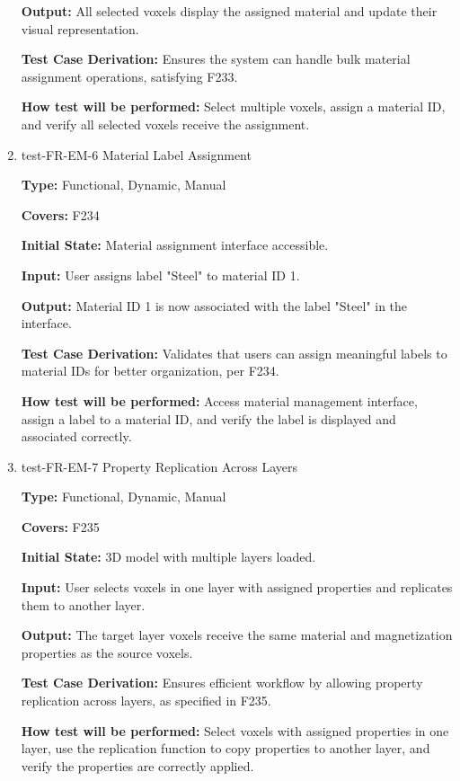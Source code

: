 \documentclass[12pt, titlepage]{article}
\begin{document}
\begin{enumerate}
\textbf{Output:} All selected voxels display the assigned material and update their visual representation.

\textbf{Test Case Derivation:} Ensures the system can handle bulk material assignment operations, satisfying F233.
					
\textbf{How test will be performed:} Select multiple voxels, assign a material ID, and verify all selected voxels receive the assignment.

\item{test-FR-EM-6 Material Label Assignment\\}

\textbf{Type:} Functional, Dynamic, Manual

\textbf{Covers:} F234
					
\textbf{Initial State:} Material assignment interface accessible.
					
\textbf{Input:} User assigns label "Steel" to material ID 1.
					
\textbf{Output:} Material ID 1 is now associated with the label "Steel" in the interface.

\textbf{Test Case Derivation:} Validates that users can assign meaningful labels to material IDs for better organization, per F234.
					
\textbf{How test will be performed:} Access material management interface, assign a label to a material ID, and verify the label is displayed and associated correctly.

\item{test-FR-EM-7 Property Replication Across Layers\\}

\textbf{Type:} Functional, Dynamic, Manual

\textbf{Covers:} F235
					
\textbf{Initial State:} 3D model with multiple layers loaded.
					
\textbf{Input:} User selects voxels in one layer with assigned properties and replicates them to another layer.
					
\textbf{Output:} The target layer voxels receive the same material and magnetization properties as the source voxels.

\textbf{Test Case Derivation:} Ensures efficient workflow by allowing property replication across layers, as specified in F235.
					
\textbf{How test will be performed:} Select voxels with assigned properties in one layer, use the replication function to copy properties to another layer, and verify the properties are correctly applied.


\end{enumerate}
\end{document}

